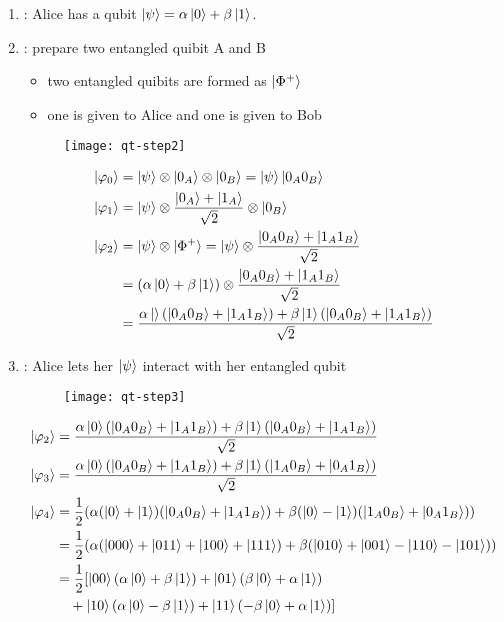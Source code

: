 \documentclass{easyclass}
\begin{document}
\begin{enumerate}
	\item : Alice has a qubit $\ket{\psi}=\alpha\ket{0}+\beta\ket{1}$.
	
	\item : prepare two entangled quibit A and B
		\begin{itemize}
			\item two entangled quibits are formed as $\ket{\Phi^+}$
			\item one is given to Alice and one is given to Bob
		\end{itemize}
		\begin{figure}[h]
			\centering
			\texttt{[image: qt-step2]}
			\label{fig:qt-step2}
		\end{figure}
	
		\begin{equation}
			\begin{aligned}
				\ket{\varphi_0}&=\ket{\psi}\otimes\ket{0_A}\otimes\ket{0_B}=\ket{\psi}\ket{0_A 0_B}\\
				\ket{\varphi_1}&=\ket{\psi}\otimes\frac{\ket{0_A}+\ket{1_A}}{\sqrt{2}}\otimes\ket{0_B}\\
				\ket{\varphi_2}&=\ket{\psi}\otimes\ket{\Phi^+}=\ket{\psi}\otimes\frac{\ket{0_A 0_B}+\ket{1_A 1_B}}{\sqrt{2}}\\
				&=(\alpha\ket{0}+\beta\ket{1})\otimes\frac{\ket{0_A 0_B}+\ket{1_A 1_B}}{\sqrt{2}}\\
				&=\frac{\alpha\ket{}(\ket{0_A 0_B}+\ket{1_A 1_B})+\beta\ket{1}(\ket{0_A 0_B}+\ket{1_A 1_B})}{\sqrt{2}}
			\end{aligned}
		\end{equation}
		
	
	\item : Alice lets her $\ket{\psi}$ interact with her entangled qubit
	\begin{figure}[h]
		\centering
		\texttt{[image: qt-step3]}
		\label{fig:qt-step3}
	\end{figure}
	
	\begin{equation}
		\begin{aligned}
			\ket{\varphi_2}&=\frac{\alpha\ket{0}(\ket{0_A 0_B}+\ket{1_A 1_B})+\beta\ket{1}(\ket{0_A 0_B}+\ket{1_A 1_B})}{\sqrt{2}}\\
			\ket{\varphi_3}&=\frac{\alpha\ket{0}(\ket{0_A 0_B}+\ket{1_A 1_B})+\beta\ket{1}(\ket{1_A 0_B}+\ket{0_A 1_B})}{\sqrt{2}}\\
			\ket{\varphi_4}&=\frac{1}{2}(\alpha(\ket{0}+\ket{1})(\ket{0_A 0_B}+\ket{1_A 1_B})+\beta(\ket{0}-\ket{1})(\ket{1_A 0_B}+\ket{0_A 1_B}))\\
			&=\frac{1}{2}(\alpha(\ket{000}+\ket{011}+\ket{100}+\ket{111})+\beta(\ket{010}+\ket{001}-\ket{110}-\ket{101}))\\
			&=\frac{1}{2}[\ket{00}(\alpha\ket{0}+\beta\ket{1})+\ket{01}(\beta\ket{0}+\alpha\ket{1})\\
			&\quad+\ket{10}(\alpha\ket{0}-\beta\ket{1})+\ket{11}(-\beta\ket{0}+\alpha\ket{1})]
		\end{aligned}
	\end{equation}
	

\end{enumerate}
\end{document}
